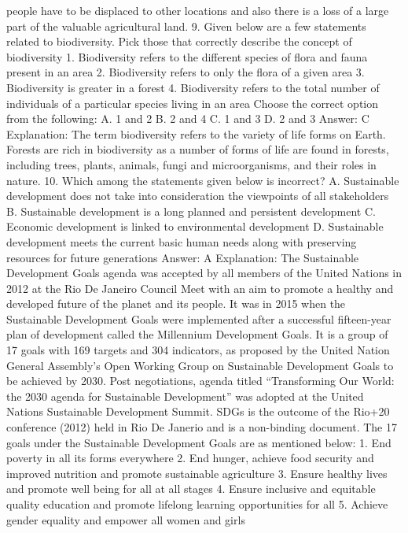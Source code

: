 people have to be displaced to other locations and also there is a loss
of a large part of the valuable agricultural land.
9. Given below are a few statements related to biodiversity. Pick
those that correctly describe the concept of biodiversity
1. Biodiversity refers to the different species of flora and fauna
present in an area
2. Biodiversity refers to only the flora of a given area
3. Biodiversity is greater in a forest
4. Biodiversity refers to the total number of individuals of a particular
species living in an area
Choose the correct option from the following:
A. 1 and 2
B. 2 and 4
C. 1 and 3
D. 2 and 3
Answer: C
Explanation: The term biodiversity refers to the variety of life forms
on Earth. Forests are rich in biodiversity as a number of forms of life
are found in forests, including trees, plants, animals, fungi and microorganisms, and their roles in nature.
10. Which among the statements given below is incorrect?
A. Sustainable development does not take into consideration the
viewpoints of all stakeholders
B. Sustainable development is a long planned and persistent
development
C. Economic development is linked to environmental development
D. Sustainable development meets the current basic human needs along
with preserving resources for future generations
Answer: A
Explanation: The Sustainable Development Goals agenda was accepted
by all members of the United Nations in 2012 at the Rio De Janeiro
Council Meet with an aim to promote a healthy and developed future of
the planet and its people. It was in 2015 when the Sustainable
Development Goals were implemented after a successful fifteen-year
plan of development called the Millennium Development Goals.
It is a group of 17 goals with 169 targets and 304 indicators, as
proposed by the United Nation General Assembly’s Open Working
Group on Sustainable Development Goals to be achieved by 2030. Post
negotiations, agenda titled “Transforming Our World: the 2030 agenda
for Sustainable Development” was adopted at the United Nations
Sustainable Development Summit. SDGs is the outcome of the Rio+20
conference (2012) held in Rio De Janerio and is a non-binding
document.
The 17 goals under the Sustainable Development Goals are as
mentioned below:
1. End poverty in all its forms everywhere
2. End hunger, achieve food security and improved nutrition and
promote sustainable agriculture
3. Ensure healthy lives and promote well being for all at all stages
4. Ensure inclusive and equitable quality education and promote
lifelong learning opportunities for all
5. Achieve gender equality and empower all women and girls
